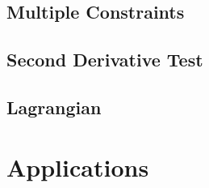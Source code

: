 \documentclass[]{article}
\begin{document}
\subsection{Multiple Constraints}

\subsection{Second Derivative Test}

\subsection{Lagrangian}

\section{Applications}
\end{document}
